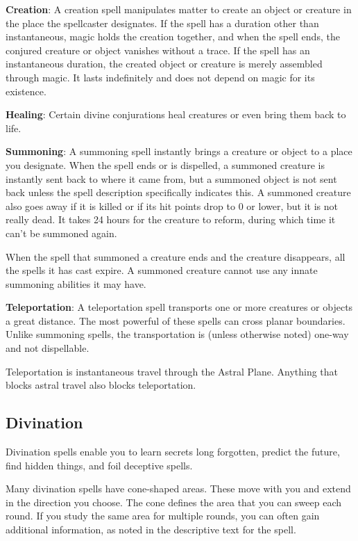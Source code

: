 \textbf{Creation}: A creation spell manipulates matter to create an object or creature in the place the spellcaster designates. If the spell has a duration other than instantaneous, magic holds the creation together, and when the spell ends, the conjured creature or object vanishes without a trace. If the spell has an instantaneous duration, the created object or creature is merely assembled through magic. It lasts indefinitely and does not depend on magic for its existence.
				
\textbf{Healing}: Certain divine conjurations heal creatures or even bring them back to life.
				
\textbf{Summoning}: A summoning spell instantly brings a creature or object to a place you designate. When the spell ends or is dispelled, a summoned creature is instantly sent back to where it came from, but a summoned object is not sent back unless the spell description specifically indicates this. A summoned creature also goes away if it is killed or if its hit points drop to 0 or lower, but it is not really dead. It takes 24 hours for the creature to reform, during which time it can't be summoned again.
				
When the spell that summoned a creature ends and the creature disappears, all the spells it has cast expire. A summoned creature cannot use any innate summoning abilities it may have.
				
\textbf{Teleportation}: A teleportation spell transports one or more creatures or objects a great distance. The most powerful of these spells can cross planar boundaries. Unlike summoning spells, the transportation is (unless otherwise noted) one-way and not dispellable.
				
Teleportation is instantaneous travel through the Astral Plane. Anything that blocks astral travel also blocks teleportation.
				
\subsection{Divination}

				
Divination spells enable you to learn secrets long forgotten, predict the future, find hidden things, and foil deceptive spells.
				
Many divination spells have cone-shaped areas. These move with you and extend in the direction you choose. The cone defines the area that you can sweep each round. If you study the same area for multiple rounds, you can often gain additional information, as noted in the descriptive text for the spell.
				

